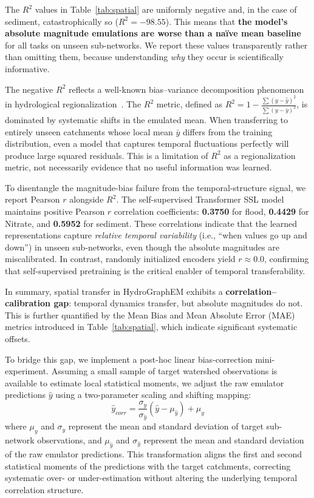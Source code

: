 \documentclass[preprint,12pt]{elsarticle}
\begin{document}
The $R^2$ values in Table~\ref{tab:spatial} are uniformly negative and, in the case of sediment, catastrophically so ($R^2 = -98.55$). This means that \textbf{the model's absolute magnitude emulations are worse than a na\"ive mean baseline} for all tasks on unseen sub-networks. We report these values transparently rather than omitting them, because understanding \textit{why} they occur is scientifically informative.

The negative $R^2$ reflects a well-known bias--variance decomposition phenomenon in hydrological regionalization~\citep{kratzert2019towards}. The $R^2$ metric, defined as $R^2 = 1 - \frac{\sum (y - \hat{y})^2}{\sum (y - \bar{y})^2}$, is dominated by systematic shifts in the emulated mean. When transferring to entirely unseen catchments whose local mean $\bar{y}$ differs from the training distribution, even a model that captures temporal fluctuations perfectly will produce large squared residuals. This is a limitation of $R^2$ as a regionalization metric, not necessarily evidence that no useful information was learned.

To disentangle the magnitude-bias failure from the temporal-structure signal, we report Pearson $r$ alongside $R^2$. The self-supervised Transformer SSL model maintains positive Pearson $r$ correlation coefficients: \textbf{0.3750} for flood, \textbf{0.4429} for Nitrate, and \textbf{0.5952} for sediment. These correlations indicate that the learned representations capture \textit{relative temporal variability} (i.e., ``when values go up and down'') in unseen sub-networks, even though the absolute magnitudes are miscalibrated. In contrast, randomly initialized encoders yield $r \approx 0.0$, confirming that self-supervised pretraining is the critical enabler of temporal transferability.

In summary, spatial transfer in HydroGraphEM exhibits a \textbf{correlation--calibration gap}: temporal dynamics transfer, but absolute magnitudes do not. This is further quantified by the Mean Bias and Mean Absolute Error (MAE) metrics introduced in Table~\ref{tab:spatial}, which indicate significant systematic offsets. 

To bridge this gap, we implement a post-hoc linear bias-correction mini-experiment. Assuming a small sample of target watershed observations is available to estimate local statistical moments, we adjust the raw emulator predictions $\hat{y}$ using a two-parameter scaling and shifting mapping:
\begin{equation}\label{eq:bias_correction}
    \hat{y}_{corr} = \frac{\sigma_y}{\sigma_{\hat{y}}} (\hat{y} - \mu_{\hat{y}}) + \mu_y
\end{equation}
where $\mu_y$ and $\sigma_y$ represent the mean and standard deviation of target sub-network observations, and $\mu_{\hat{y}}$ and $\sigma_{\hat{y}}$ represent the mean and standard deviation of the raw emulator predictions. This transformation aligns the first and second statistical moments of the predictions with the target catchments, correcting systematic over- or under-estimation without altering the underlying temporal correlation structure.
\end{document}
